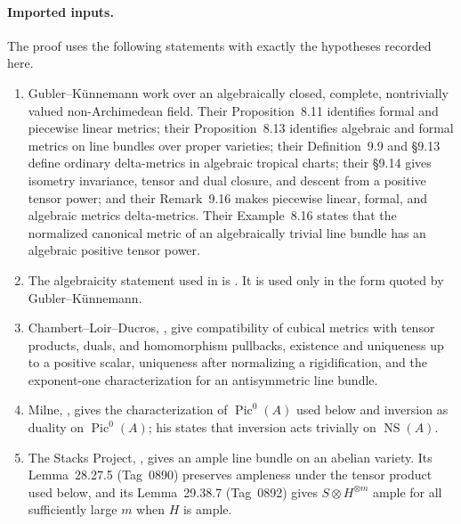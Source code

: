 
\paragraph{Imported inputs.}
The proof uses the following statements with exactly the hypotheses recorded
here.
\begin{enumerate}
\item Gubler--K\"unnemann work over an algebraically closed, complete,
nontrivially valued non-Archimedean field.  Their Proposition~8.11
identifies formal and piecewise linear metrics; their Proposition~8.13
identifies algebraic and formal metrics on line bundles over proper
varieties; their Definition~9.9 and \S9.13 define ordinary delta-metrics in
algebraic tropical charts; their \S9.14 gives isometry invariance, tensor
and dual closure, and descent from a positive tensor power; and their
Remark~9.16 makes piecewise linear, formal, and algebraic metrics
delta-metrics.  Their Example~8.16 states that the normalized canonical
metric of an algebraically trivial line bundle has an algebraic positive
tensor power.

\item The algebraicity statement used in
\cite[Example~8.16]{GK17} is \cite[Example~3.7]{Gub10CM}.  It is used only
in the form quoted by Gubler--K\"unnemann.

\item Chambert--Loir--Ducros,
\cite[Lemmas~19.1.4 and 19.1.6]{CLD25}, give compatibility of cubical
metrics with tensor products, duals, and homomorphism pullbacks, existence
and uniqueness up to a positive scalar, uniqueness after normalizing a
rigidification, and the exponent-one characterization for an
antisymmetric line bundle.

\item Milne, \cite[Proposition~8.4 and Remark~8.5]{milneAV}, gives the
characterization of \(\operatorname{Pic}^0(A)\) used below and inversion as
duality on \(\operatorname{Pic}^0(A)\); his
\cite[Remark~10.19]{milneAV} states that inversion acts trivially on
\(\operatorname{NS}(A)\).

\item The Stacks Project, \cite[Lemma~39.9.2]{stacks-project}, gives an
ample line bundle on an abelian variety.  Its Lemma~28.27.5
(Tag~0890) preserves ampleness under the tensor product used below, and
its Lemma~29.38.7 (Tag~0892) gives
\(S\otimes H^{\otimes m}\) ample for all sufficiently large \(m\) when
\(H\) is ample.
\end{enumerate}


